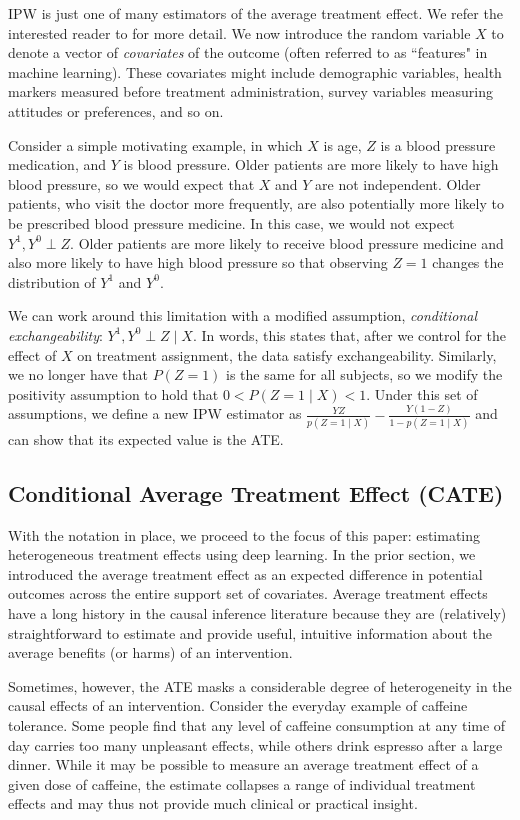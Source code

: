 \documentclass[11pt,  dvipsnames, table, x11name]{article}
\begin{document}
	IPW is just one of many estimators of the average treatment effect. We refer the interested reader to 
	\cite{hernan2020causal} for more detail. We now introduce the random variable $X$ to denote a 
	vector of \textit{covariates} of the outcome (often referred to as ``features" in machine learning). 
	These covariates might include demographic variables, health markers measured before treatment 
	administration, survey variables measuring attitudes or preferences, and so on. 
	
	Consider a simple motivating example, in which $X$ is age, $Z$ is a blood 
	pressure medication, and $Y$ is blood pressure. Older patients are more likely to have high blood 
	pressure, so we would expect that $X$ and $Y$ are not independent. Older patients, who visit 
	the doctor more frequently, are also potentially more likely to be prescribed blood pressure medicine. 
	In this case, we would not expect $Y^1, Y^0 \perp Z$. Older patients are more likely to receive blood pressure 
	medicine and also more likely to have high blood pressure so that observing $Z = 1$ changes the distribution of 
	$Y^1$ and $Y^0$. 
	
	We can work around this limitation with a modified assumption, \textit{conditional exchangeability}: 
	$Y^1, Y^0 \perp Z \mid X$. In words, this states that, after we control for the effect of $X$ on treatment 
	assignment, the data satisfy exchangeability. Similarly, we no longer have that $P(Z = 1)$ is the same 
	for all subjects, so we modify the positivity assumption to hold that $0 < P(Z = 1 \mid X) < 1$.
	Under this set of assumptions, we define a new IPW estimator as 
	$\frac{YZ}{p(Z = 1 \mid X)} - \frac{Y(1-Z)}{1 - p(Z = 1 \mid X)}$ and can show that its expected 
	value is the ATE.
	\subsection{Conditional Average Treatment Effect (CATE)}
	With the notation in place, we proceed to the focus of this paper: estimating heterogeneous 
	treatment effects using deep learning. In the prior section, we introduced the average treatment effect 
	as an expected difference in potential outcomes across the entire support set of covariates. 
	Average treatment effects have a long history in the causal inference literature because they are 
	(relatively) straightforward to estimate and provide useful, intuitive information about the average 
	benefits (or harms) of an intervention.  
	
	Sometimes, however, the ATE masks a considerable degree of heterogeneity in the causal effects of 
	an intervention. Consider the everyday example of caffeine tolerance. Some people find that any level 
	of caffeine consumption at any time of day carries too many unpleasant effects, while others drink 
	espresso after a large dinner. While it may be possible to measure an average treatment effect of a 
	given dose of caffeine, the estimate collapses a range of individual treatment effects and may thus 
	not provide much clinical or practical insight.
	
\end{document}
